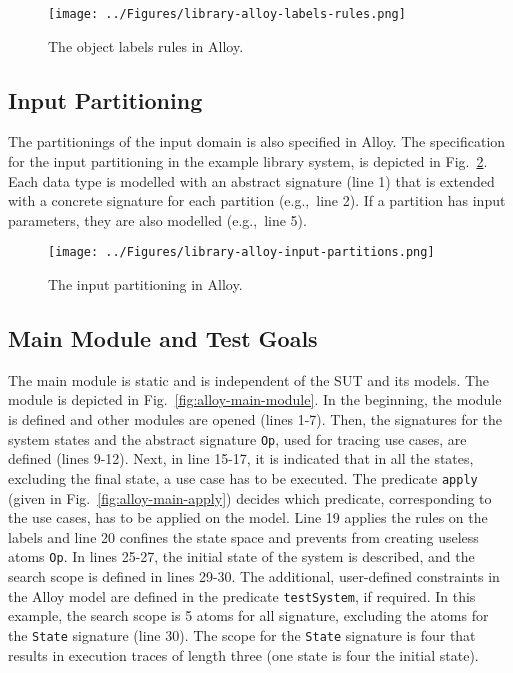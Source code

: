 \begin{figure}[h]
\centering
\texttt{[image: ../Figures/library-alloy-labels-rules.png]}
\caption{The object labels rules in Alloy.}
\label{fig:library-alloy-labels-rules}
\end{figure}

\subsection{Input Partitioning}
\label{sec:alloy-input-partitioning}
The partitionings of the input domain is also specified in Alloy. The specification for the input partitioning in the example library system, is depicted in Fig.~\ref{fig:library-alloy-input-partitions}. Each data type is modelled with an abstract signature (line 1) that is extended with a concrete signature for each partition (e.g.,\ line 2). If a partition has input parameters, they are also modelled (e.g.,\ line 5).

\begin{figure}[h]
\centering
\texttt{[image: ../Figures/library-alloy-input-partitions.png]}
\caption{The input partitioning in Alloy.}
\label{fig:library-alloy-input-partitions}
\end{figure}


\subsection{Main Module and Test Goals}
\label{sec:alloy-main-module}
The main module is static and is independent of the SUT and its models. The module is depicted in Fig.~\ref{fig:alloy-main-module}. In the beginning, the module is defined and other modules are opened (lines 1-7). Then, the signatures for the system states and the abstract signature \texttt{Op}, used for tracing use cases, are defined (lines 9-12). Next, in line 15-17, it is indicated that in all the states, excluding the final state, a use case has to be executed. The predicate \texttt{apply} (given in Fig.~\ref{fig:alloy-main-apply}) decides which predicate, corresponding to the use cases, has to be applied on the model. Line 19 applies the rules on the labels and line 20 confines the state space and prevents from creating useless atoms \texttt{Op}. In lines 25-27, the initial state of the system is described, and the search scope is defined in lines 29-30. The additional, user-defined constraints in the Alloy model are defined in the predicate \texttt{testSystem}, if required. In this example, the search scope is 5 atoms for all signature, excluding the atoms for the \texttt{State} signature (line 30). The scope for the \texttt{State} signature is four that results in execution traces of length three (one state is four the initial state).

